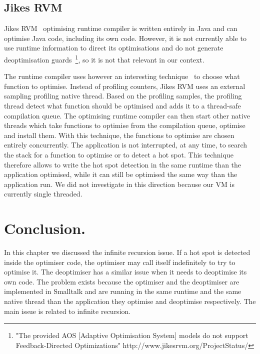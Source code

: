 \documentclass[a4paper,12pt,twoside]{../includes/ThesisStyle}
\begin{document}
\subsection{Jikes RVM}

Jikes RVM~\cite{Alp99a,Arn00} optimising runtime compiler is written entirely in Java and can optimise Java code, including its own code. However, it is not currently able to use runtime information to direct its optimisations and do not generate deoptimisation guards~\footnote{"The provided AOS [Adaptive Optimisation System] models do not support Feedback-Directed Optimizations" http://www.jikesrvm.org/ProjectStatus/}, so it is not that relevant in our context. 

The runtime compiler uses however an interesting technique~\cite{Arn00} to choose what function to optimise. Instead of profiling counters, Jikes RVM uses an external sampling profiling native thread. Based on the profiling samples, the profiling thread detect what function should be optimised and adds it to a thread-safe compilation queue. The optimising runtime compiler can then start other native threads which take functions to optimise from the compilation queue, optimise and install them. With this technique, the functions to optimise are chosen entirely concurrently. The application is not interrupted, at any time, to search the stack for a function to optimise or to detect a hot spot. This technique therefore allows to write the hot spot detection in the same runtime than the application optimised, while it can still be optimised the same way than the application run. We did not investigate in this direction because our VM is currently single threaded.


\section{Conclusion.}

In this chapter we discussed the infinite recursion issue. If a hot spot is detected inside the optimiser code, the optimiser may call itself indefinitely to try to optimise it. The deoptimiser has a similar issue when it needs to deoptimise its own code. The problem exists because the optimiser and the deoptimiser are implemented in Smalltalk and are running in the same runtime and the same native thread than the application they optimise and deoptimise respectively. The main issue is related to infinite recursion.
\end{document}
